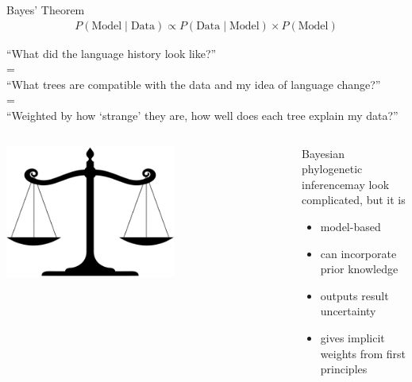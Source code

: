 \documentclass[9pt]{beamer}
\begin{document}
\begin{frame}{Bayes' Theorem}
  \begin{align}
    \nonumber
    P(\text{Model} \mid \text{Data}) \propto P(\text{Data} \mid \text{Model}) \times P(\text{Model})
  \end{align}

  \begin{center}
    “What did the language history look like?” \\ = \\  “What trees are compatible with
    the data and my idea of language change?” \\ = \\ “Weighted by how ‘strange’
    they are, how well does each tree explain my data?”
  \end{center}
  \begin{columns}
    \begin{column}{0.5\textwidth}
      \begin{center}
        \footnotemark\includegraphics[width=0.6\textwidth]{scale.png}
      \end{center}
    \end{column}
    \begin{column}{0.5\textwidth}
      \pause
      Bayesian phylogenetic inference\footnotemark may look complicated, but it is
      \begin{itemize}
      \item model-based
      \item can incorporate prior knowledge
      \item outputs result uncertainty
      \item gives implicit weights from first principles
      \end{itemize}
    \end{column}
  \end{columns}
\end{frame}
\end{document}
